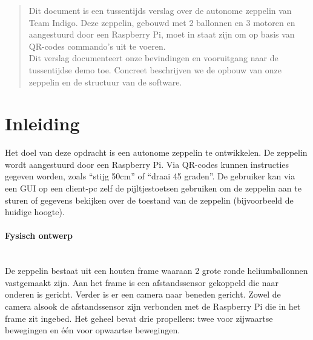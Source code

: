 \documentclass[tt]{penoverslag}
\begin{document}
\maketitlepage


\begin{abstract}
Dit document is een tussentijds verslag over de autonome zeppelin van Team Indigo. Deze zeppelin, gebouwd met 2 ballonnen en 3 motoren en aangestuurd door een Raspberry Pi, moet in staat zijn om op basis van QR-codes commando's uit te voeren.\\
Dit verslag documenteert onze bevindingen en vooruitgang naar de tussentijdse demo toe. Concreet beschrijven we de opbouw van onze zeppelin en de structuur van de software.
\end{abstract}


\tableofcontents\newpage


\section{Inleiding}
Het doel van deze opdracht is een autonome zeppelin te ontwikkelen. De zeppelin wordt aangestuurd door een Raspberry Pi. Via QR-codes kunnen instructies gegeven worden, zoals ``stijg 50cm'' of ``draai 45   graden''. De gebruiker kan via een GUI op een client-pc zelf de pijltjestoetsen gebruiken om de zeppelin aan te sturen of gegevens bekijken over de toestand van de zeppelin (bijvoorbeeld de huidige hoogte).

\paragraph{Fysisch ontwerp}
~\\ 
De zeppelin bestaat uit een houten frame waaraan 2 grote ronde heliumballonnen vastgemaakt zijn. Aan het frame is een afstandssensor gekoppeld die naar onderen is gericht. Verder is er een camera naar beneden gericht. Zowel de camera alsook de afstandssensor zijn verbonden met de Raspberry Pi die in het frame zit ingebed. Het geheel bevat drie propellers: twee voor zijwaartse bewegingen en \'{e}\'{e}n voor opwaartse bewegingen.
\end{document}
